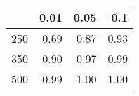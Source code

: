 % 
\begin{tabular}{rrrr}
  \hline
 & 0.01 & 0.05 & 0.1 \\ 
  \hline
250 & 0.69 & 0.87 & 0.93 \\ 
  350 & 0.90 & 0.97 & 0.99 \\ 
  500 & 0.99 & 1.00 & 1.00 \\ 
   \hline
\end{tabular}
